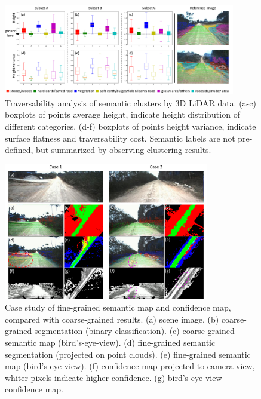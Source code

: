 \documentclass[letterpaper, 10 pt, conference]{ieeeconf}  %
\begin{document}
	\begin{figure}[]
		\centering
		\includegraphics[width=0.9\textwidth]{lidar_analysis.pdf}
		\caption{Traversability analysis of semantic clusters by 3D LiDAR data. (a-c) boxplots of points average height, indicate height distribution of different categories. (d-f) boxplots of points height variance, indicate surface flatness and traversability cost. Semantic labels are not pre-defined, but summarized by observing clustering results.}
		\label{fig:lidar_analysis}
		\vspace{-5mm}
	\end{figure}
	
	
	\begin{figure}[]
		\centering
		\includegraphics[width=0.8\textwidth]{semantic_mapping.pdf}
		\caption{Case study of fine-grained semantic map and confidence map, compared with coarse-grained  results. (a) scene image. (b) coarse-grained segmentation (binary classification). (c) coarse-grained semantic map (bird's-eye-view). (d) fine-grained semantic segmentation (projected on point clouds). (e) fine-grained semantic map (bird's-eye-view). (f) confidence map projected to camera-view, whiter pixels indicate higher confidence. (g) bird's-eye-view confidence map.}
		\label{fig:semantic_mapping}
		\vspace{-4mm}
	\end{figure}
	
\end{document}
